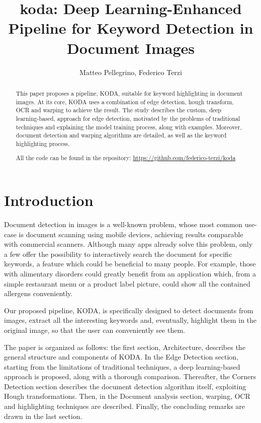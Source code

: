 \documentclass[a4paper]{article}
\title{koda: Deep Learning-Enhanced Pipeline for Keyword Detection in Document Images}
\author{Matteo Pellegrino, Federico Terzi}
\begin{document}
\maketitle

\begin{abstract}
This paper proposes a pipeline, KODA, suitable for keyword highlighting in document images. At its core, KODA uses a combination of edge detection, hough transform, OCR and warping to achieve the result. The study describes the custom, deep learning-based, approach for edge detection, motivated by the problems of traditional techniques and explaining the model training process, along with examples. Moreover, document detection and warping algorithms are detailed, as well as the keyword highlighting process.

\vspace{1cm}
All the code can be found in the repository: \url{https://github.com/federico-terzi/koda}
\end{abstract}

\begingroup\let\clearpage\relax
\vspace{1cm}
\tableofcontents \endgroup

\section{Introduction}
Document detection in images is a well-known problem, whose most common use-case is document scanning using mobile devices, achieving results comparable with commercial scanners. Although many apps already solve this problem, only a few offer the possibility to interactively search the document for specific keywords, a feature which could be beneficial to many people. For example, those with alimentary disorders could greatly benefit from an application which, from a simple restaurant menu or a product label picture, could show all the contained allergens conveniently.

Our proposed pipeline, KODA, is specifically designed to detect documents from images, extract all the interesting keywords and, eventually, highlight them in the original image, so that the user can conveniently see them.

The paper is organized as follows: the first section, Architecture, describes the general structure and components of KODA. In the Edge Detection section, starting from the limitations of traditional techniques, a deep learning-based approach is proposed, along with a thorough comparison. Thereafter, the Corners Detection section describes the document detection algorithm itself, exploiting Hough transformations. Then, in the Document analysis section, warping, OCR and highlighting techniques are described. Finally, the concluding remarks are drawn in the last section.
\end{document}
